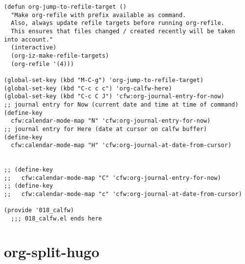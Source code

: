 \documentclass[11pt]{article}
\begin{document}
\begin{verbatim}
(defun org-jump-to-refile-target ()
  "Make org-refile with prefix available as command.
  Also, always update refile targets before running org-refile.
  This ensures that files changed / created recently will be taken into account."
  (interactive)
  (org-iz-make-refile-targets)
  (org-refile '(4)))

(global-set-key (kbd "M-C-g") 'org-jump-to-refile-target)
(global-set-key (kbd "C-c c c") 'org-calfw-here)
(global-set-key (kbd "C-c C J") 'cfw:org-journal-entry-for-now)
;; journal entry for Now (current date and time at time of command)
(define-key
  cfw:calendar-mode-map "N" 'cfw:org-journal-entry-for-now)
;; journal entry for Here (date at cursor on calfw buffer)
(define-key
  cfw:calendar-mode-map "H" 'cfw:org-journal-at-date-from-cursor)


;; (define-key
;;   cfw:calendar-mode-map "C" 'cfw:org-journal-entry-for-now)
;; (define-key
;;   cfw:calendar-mode-map "c" 'cfw:org-journal-at-date-from-cursor)

(provide '018_calfw)
  ;;; 018_calfw.el ends here
\end{verbatim}

\section{org-split-hugo}
\label{sec:orgcdde828}
\end{document}
